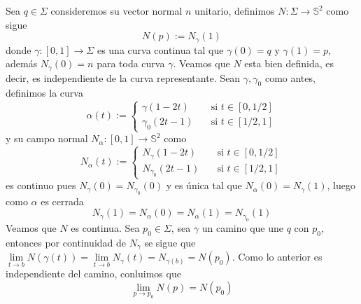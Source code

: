 \documentclass{article}
\begin{document}
\begin{enumerate}
    Sea $q\in\Sigma$ consideremos su vector normal $n$ unitario, definimos 
    $N:\Sigma\to\mathbb{S}^{2}$ como sigue
    \begin{equation*}
        N(p):=N_{\gamma}(1)
    \end{equation*}
    donde $\gamma:[0,1]\to\Sigma$ es una curva continua tal que $\gamma(0)=q$ y $\gamma(1)=p$, 
    además $N_{\gamma}(0)=n$ para toda curva $\gamma$. Veamos que $N$ esta bien definida, es decir,
    es independiente de la curva representante. Sean $\gamma,\gamma_{0}$ como antes, definimos la
    curva
    \begin{equation*}
        \alpha(t):=\begin{cases}
            \gamma(1-2t) &\quad\text{si }t\in[0,1/2] \\
            \gamma_{0}(2t-1) &\quad\text{si }t\in[1/2,1]
        \end{cases}
    \end{equation*}
    y su campo normal $N_{\alpha}:[0,1]\to\mathbb{S}^{2}$ como
    \begin{equation*}
        N_{\alpha}(t):=\begin{cases}
            N_{\gamma}(1-2t) &\quad\text{si }t\in[0,1/2] \\
            N_{\gamma_{0}}(2t-1) &\quad\text{si }t\in[1/2,1]
        \end{cases}
    \end{equation*}
    es continuo pues $N_{\gamma}(0)=N_{\gamma_{0}}(0)$ y es única tal que $N_{\alpha}(0)
    =N_{\gamma}(1)$, luego como $\alpha$ es cerrada
    \begin{equation*}
        N_{\gamma}(1)=N_{\alpha}(0)=N_{\alpha}(1)=N_{\gamma_{0}}(1)
    \end{equation*}
    Veamos que $N$ es continua. Sea $p_{0}\in\Sigma$, sea $\gamma$ un camino que une $q$ con 
    $p_{0}$, entonces por continuidad de $N_{\gamma}$ se sigue que $\lim\limits_{t\to b}
    N(\gamma(t))=\lim\limits_{t\to b}N_{\gamma}(t)=N_{\gamma(b)}=N(p_{0})$. Como lo anterior es 
    independiente del camino, conluimos que
    \begin{equation*}
        \lim\limits_{p\to p_{0}}N(p)=N(p_{0})
    \end{equation*}
\end{enumerate}
\end{document}
